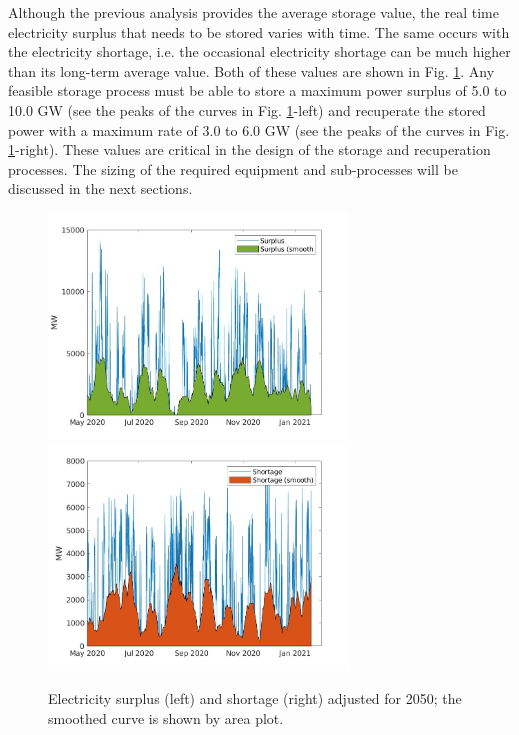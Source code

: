 \documentclass{ECOS_2021}
\begin{document}
Although the previous analysis provides the average storage value,
the real time electricity surplus that needs to be stored varies with
time. The same occurs with the electricity shortage, i.e. the occasional
electricity shortage can be much higher than its long-term average
value. Both of these values are shown in Fig. \ref{fig:Electricity-surplus-smooth}.
Any feasible storage process must be able to store a maximum power
surplus of 5.0 to 10.0 GW (see the peaks of the curves in Fig. \ref{fig:Electricity-surplus-smooth}-left)
and recuperate the stored power with a maximum rate of 3.0 to 6.0
GW (see the peaks of the curves in Fig. \ref{fig:Electricity-surplus-smooth}-right).
These values are critical in the design of the storage and recuperation
processes. The sizing of the required equipment and sub-processes
will be discussed in the next sections. 

\begin{figure}[H]
\includegraphics[width=8cm]{smoothed_surplus}\includegraphics[width=8cm]{smoothed_deficit}

\caption{\label{fig:Electricity-surplus-smooth}Electricity surplus (left)
and shortage (right) adjusted for 2050; the smoothed curve is shown
by area plot.}
\end{figure}
\end{document}
